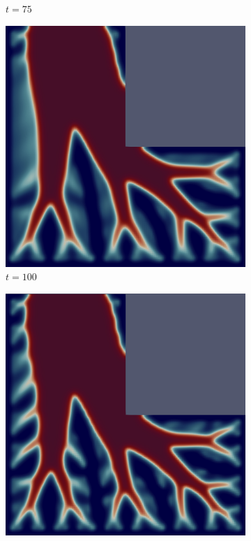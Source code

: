 \begin{figure}[H]
\begin{subfigure}{.4\textwidth}
        \caption{$t = 75$}
    \end{subfigure}
    \begin{subfigure}{.4\textwidth}
        \includegraphics[width=\textwidth]{imgs/LShape/fifth.png}
        \caption{$t = 100$}
    \end{subfigure}
    \begin{subfigure}{.4\textwidth}
        \includegraphics[width=\textwidth]{imgs/LShape/sixth.png}

\end{subfigure}
\end{figure}
